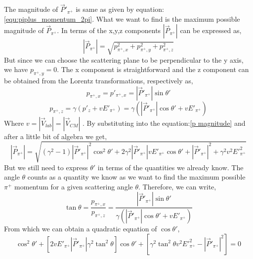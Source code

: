 The magnitude of $\vec{P}'_{\pi^+}$ is same as given by equation:\ref{equ:piplus_momentum_2pi}. What we want to find is the maximum possible magnitude of $\vec{P}_{\pi^+}$. 
In terms of the x,y,z components $|\vec{P}_{\pi^+}|$ can be expressed as,
\begin{equation}
    |\vec{P}_{\pi^+}| = \sqrt{p_{\pi^+,x}^2 + p_{\pi^+,y}^2 + p_{\pi^+,z}^2}
    \label{p magnitude}
\end{equation}
But since we can choose the scattering plane to be perpendicular to the y axis, we have $p_{\pi^+,y}=0$. The x component is straightforward and the z component can be obtained from the Lorentz transformations, respectively as,
\begin{equation}
    p_{\pi^+,x} = p'_{\pi^+,x} = |\vec{P}'_{\pi^+}|\sin{\theta'}
    \label{p_x}
\end{equation}
\begin{equation}
    p_{\pi^+,z} = \gamma(p'_z + vE'_{\pi^+}) = \gamma(|\vec{P}'_{\pi^+}|\cos{\theta'} + vE'_{\pi^+})
    \label{p_z}
\end{equation}
Where $v = |\vec{V}_{lab}| = |\vec{V}_{CM}|$ .
By substituting into the equation:\ref{p magnitude} and after a little bit of algebra we get,
\begin{equation}
    |\vec{P}_{\pi^+}| = \sqrt{(\gamma^2-1)|\vec{P}'_{\pi^+}|^2\cos^2{\theta'} + 2\gamma^2|\vec{P}'_{\pi^+}|vE'_{\pi^+}\cos{\theta'} + |\vec{P}'_{\pi^+}|^2 + \gamma^2v^2E'^{2}_{\pi^+}}
    \label{equ: pi+ momentum magnitude in lab frame for polar angle case}
\end{equation}
 But we still need to express $\theta'$ in terms of the quantities we already know. The angle $\theta$ counts as a quantity we know as we want to find the maximum possible $\pi^+$ momentum for a given scattering angle $\theta$. Therefore, we can write,
 \begin{equation}
     \tan{\theta} = \frac{p_{\pi^+,x}}{p_{\pi^+,z}} = \frac{|\vec{P}'_{\pi^+}|\sin{\theta'}}{\gamma(|\vec{P}'_{\pi^+}|\cos{\theta'} + vE'_{\pi^+})}
 \end{equation}
 From which we can obtain a quadratic equation of $\cos{\theta'}$,
 \begin{equation}
     [(\gamma^2\tan^2{\theta} + 1)|\vec{P}'_{\pi^+}|^2]\cos^2{\theta'} + [2vE'_{\pi^+}|\vec{P}'_{\pi^+}|\gamma^2\tan^2{\theta}]\cos{\theta'} + [\gamma^2\tan^2{\theta}v^2E'^{2}_{\pi^+}-|\vec{P}'_{\pi^+}|^2] = 0
 \end{equation}
